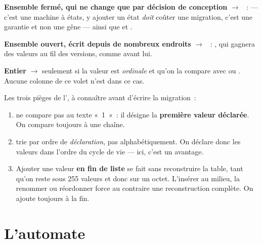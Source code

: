\begin{note}
\textbf{Ensemble fermé, qui ne change que par décision de conception} $\rightarrow$
~:  --- c'est une machine à états, y ajouter un état \emph{doit}
coûter une migration, c'est une garantie et non une gêne --- ainsi que  et
.

\textbf{Ensemble ouvert, écrit depuis de nombreux endroits} $\rightarrow$ ~:
, qui gagnera des valeurs au fil des versions, comme
 avant lui.

\textbf{Entier} $\rightarrow$ seulement si la valeur est \emph{ordinale} et qu'on la compare
avec \code{<} ou \code{>}. Aucune colonne de ce volet n'est dans ce cas.

Les trois pièges de l', à connaître avant d'écrire la migration~:
\begin{enumerate}[leftmargin=1.6em]
  \item {} ne compare pas au texte «~1~»~: il désigne la
        \textbf{première valeur déclarée}. On compare toujours à une chaîne.
  \item {} trie par ordre de \emph{déclaration}, pas alphabétiquement.
        On déclare donc les valeurs dans l'ordre du cycle de vie --- ici, c'est un avantage.
  \item Ajouter une valeur \textbf{en fin de liste} se fait sans reconstruire la table, tant
        qu'on reste sous 255 valeurs et donc sur un octet. L'insérer au milieu, la renommer
        ou réordonner force au contraire une reconstruction complète. On ajoute toujours à
        la fin.
\end{enumerate}
\end{note}

\section{L'automate}

